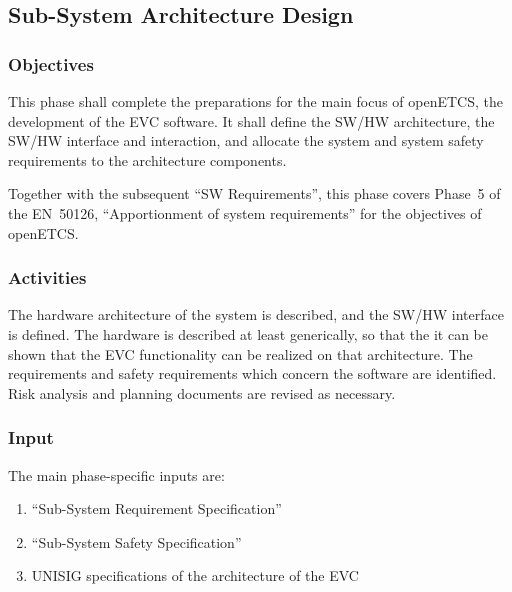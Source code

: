 \documentclass{template/openetcs_article}
\begin{document}




\subsection{Sub-System Architecture Design}
\label{sec:sub-system-AD}

\subsubsection{Objectives}
\label{sec:2-objectives}
This phase shall complete the preparations for the main focus of
openETCS, the development of the EVC software. It shall define the
SW/HW architecture, the SW/HW interface and interaction, and 
allocate the system and system safety requirements to the
architecture components.

Together with the subsequent ``SW Requirements'', this phase covers
Phase~5 of the EN~50126, ``Apportionment of system requirements'' for
the objectives of openETCS. 

\subsubsection{Activities}
\label{sec:2-activities}
The hardware architecture of the system is described, and the SW/HW
interface is defined.  The hardware is described at least generically,
so that the it can be shown that the EVC functionality can be realized
on that architecture. The requirements and safety requirements which
concern the software are identified. Risk analysis and planning
documents are revised as necessary.

\subsubsection{Input}
\label{sec:2-input}

The main phase-specific inputs are:
\begin{enumerate}
\item ``Sub-System Requirement Specification''
\item ``Sub-System Safety Specification''
\item UNISIG specifications of the architecture of the EVC
\end{enumerate}
\end{document}
